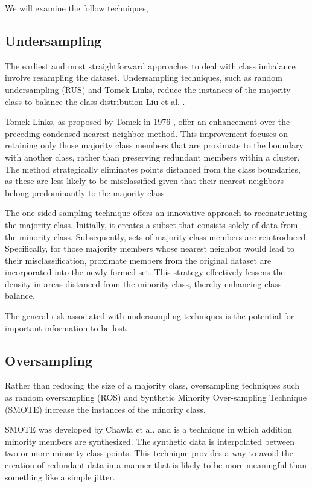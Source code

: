 \documentclass[journal]{IEEEtran}
\begin{document}
		We will examine the follow techniques,
		\subsection{Undersampling}
		
		The earliest and most straightforward approaches to deal with class imbalance involve resampling the dataset. Undersampling techniques, such as random undersampling (RUS) and Tomek Links, reduce the instances of the majority class to balance the class distribution Liu et al. \cite{liu2009}. 
	
		Tomek Links, as proposed by Tomek in 1976 \cite{tomek1976}, offer an enhancement over the preceding condensed nearest neighbor method. This improvement focuses on retaining only those majority class members that are proximate to the boundary with another class, rather than preserving redundant members within a cluster. The method strategically eliminates points distanced from the class boundaries, as these are less likely to be misclassified given that their nearest neighbors belong predominantly to the majority class
	
		The one-sided sampling technique \cite{kubat1997} offers an innovative approach to reconstructing the majority class. Initially, it creates a subset that consists solely of data from the minority class. Subsequently, sets of majority class members are reintroduced. Specifically, for those majority members whose nearest neighbor would lead to their misclassification, proximate members from the original dataset are incorporated into the newly formed set. This strategy effectively lessens the density in areas distanced from the minority class, thereby enhancing class balance.
	
		The general risk associated with undersampling techniques is the potential for important information to be lost.
	
		\subsection{Oversampling}
	
		Rather than reducing the size of a majority class, oversampling techniques such as random oversampling (ROS) and Synthetic Minority Over-sampling Technique (SMOTE) increase the instances of the minority class. 
	
		SMOTE was developed by Chawla et al. \cite{chawla2002} and is a technique in which addition minority members are synthesized. The synthetic data is interpolated between two or more minority class points. This technique provides a way to avoid the creation of redundant data in a manner that is likely to be more meaningful than something like a simple jitter. 
	
\end{document}
